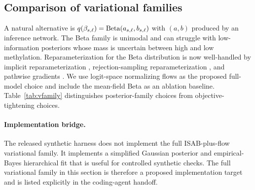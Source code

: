 \subsection{Comparison of variational families}
A natural alternative is $q(\beta_{s,\ell})=\mathrm{Beta}(a_{s,\ell},b_{s,\ell})$ with $(a,b)$ produced by an inference network. The Beta family is unimodal and can struggle with low-information posteriors whose mass is uncertain between high and low methylation. Reparameterization for the Beta distribution is now well-handled by implicit reparameterization \citep{figurnov2018implicit}, rejection-sampling reparameterization \citep{naesseth2017reparam}, and pathwise gradients \citep{jankowiak2018pathwise}. We use logit-space normalizing flows as the proposed full-model choice and include the mean-field Beta as an ablation baseline. Table~\ref{tab:vfamily} distinguishes posterior-family choices from objective-tightening choices.

\begin{table}[htbp]
\centering\small
\caption{Posterior-family and objective choices for the per-(sample, locus) layer. IWAE tightens the training objective for a chosen posterior family rather than defining a separate family by itself.}
\label{tab:vfamily}
\end{table}

\paragraph{Implementation bridge.} The released synthetic harness does not implement the full ISAB-plus-flow variational family. It implements a simplified Gaussian posterior and empirical-Bayes hierarchical fit that is useful for controlled synthetic checks. The full variational family in this section is therefore a proposed implementation target and is listed explicitly in the coding-agent handoff.

